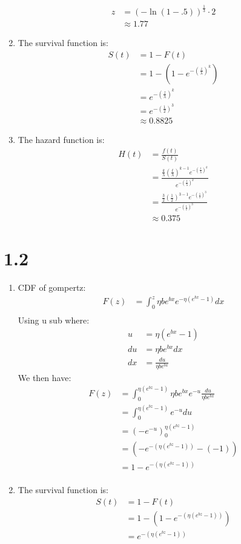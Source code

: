\documentclass{article}
\begin{document}
\begin{enumerate}
\begin{align*}
z &= (-\ln(1 - .5))^{\frac{1}{3}} \cdot 2 \\
&\approx 1.77
\end{align*}
\item The survival function is: \\
\begin{align*}
S(t) &= 1 - F(t) \\
&= 1 - (1 - e^{-(\frac{z}{\lambda})^k}) \\
& = e^{-(\frac{z}{\lambda})^k} \\
&=  e^{-(\frac{1}{2})^3} \\
&\approx 0.8825
\end{align*}
\item The hazard function is: \\
\begin{align*}
H(t) &= \frac{f(t)}{S(t)} \\
&= \frac{\frac{k}{\lambda} (\frac{t}{\lambda})^{k-1}e^{-(\frac{t}{\lambda})^k}}{e^{-(\frac{t}{\lambda})^k}} \\
&= \frac{\frac{3}{2} (\frac{1}{2})^{3-1}e^{-(\frac{1}{2})^3}}{e^{-(\frac{1}{2})^3}} \\
&\approx 0.375
\end{align*}
\end{enumerate}
\section*{1.2}
\begin{enumerate}
\item CDF of gompertz: \\
\begin{align*}
F(z) &= \int_0^z\eta b e^{bx}e^{-\eta(e^{bx} - 1)}dx \\
\end{align*}
Using u sub where: \\
\begin{align*}
u &= \eta(e^{bx} - 1) \\
du &= \eta b e^{bx}dx \\
dx &= \frac{du}{\eta b e^{bx}} 
\end{align*}
We then have: \\
\begin{align*}
F(z) &= \int_0^{\eta(e^{bz} - 1)}\eta b e^{bx}e^{-u}\frac{du}{\eta b e^{bx}} \\
&= \int_0^{\eta(e^{bz} - 1)}e^{-u}du \\
&= (-e^{-u})_0^{\eta(e^{bz} - 1)} \\
&= (-e^{-(\eta(e^{bz} - 1))} - (-1)) \\
&= 1 - e^{-(\eta(e^{bz} - 1))} \\
\end{align*}
\item The survival function is: \\
\begin{align*}
S(t) &= 1 - F(t) \\
&= 1 -  (1 - e^{-(\eta(e^{bz} - 1))}) \\
&= e^{-(\eta(e^{bz} - 1))} \\
\end{align*}
\end{enumerate}
\end{document}
